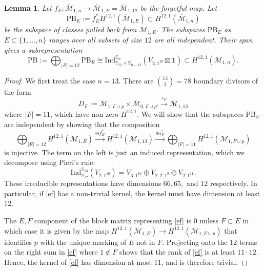 \documentclass[12pt]{amsart}
\newtheorem{lem}[thm]{Lemma}
\theoremstyle{definition}
\numberwithin{equation}{section}
\newcommand{\M}{\mathcal{M}}
\newcommand{\Mb}{\overline{\M}}
\newcommand{\pb}{\mathrm{PB}}
\theoremstyle{definition} %
\theoremstyle{remark}
\begin{document}
\begin{lem} \label{indep}
Let $f_E\colon \Mb_{1,n} \to \Mb_{1,E} = \Mb_{1,12}$ be the forgetful map. Let \[\pb_E := f_E^*H^{12,1}(\Mb_{1,E}) \subset H^{12,1}(\Mb_{1,n})\]
be the subspace of classes pulled back from $\Mb_{1,E}$. The subspaces $\pb_E$ as $E \subset \{1,\ldots, n\}$ ranges over all subsets of size $12$
are all independent. Their span gives a subrepresentation
\[\pb :=\bigoplus_{|E| = 12} \pb_E \cong \mathrm{Ind}^{\mathbb{S}_n}_{\mathbb{S}_{12} \times \mathbb{S}_{n-12}}(V_{2,1^{10}} \boxtimes \mathbf{1}) \subset H^{12,1}(\Mb_{1,n}).\]
\end{lem}
\begin{proof}
We first treat the case $n = 13$. 
There are $\binom{13}{2} = 78$ boundary divisors of the form 
\[D_F := \Mb_{1,F \cup p} \times \Mb_{0, F \cup p'} \xrightarrow{\iota_F} \Mb_{1,13}\] where $|F| = 11$, which have non-zero $H^{12,1}$.
We will show that the subspaces $\pb_E$ are independent by showing that the composition
\begin{equation} \label{ef} \bigoplus_{|E| = 12} H^{12,1}(\Mb_{1,E}) \xrightarrow{\oplus f_E^*} H^{12,1}(\Mb_{1,13}) \xrightarrow{\oplus \iota_F^*} \bigoplus_{|F| = 11} H^{12,1}(\Mb_{1,F \cup p})
\end{equation}
is injective. 
The term on the left is just an induced representation, which we decompose using Pieri's rule:
\[\mathrm{Ind}^{\mathbb{S}_{13}}_{\mathbb{S}_{12}} (V_{2, 1^{10}}) =  V_{3,1^{10}} \oplus V_{2,2,1^{9}} \oplus V_{2,1^{11}}.\]
These irreducible representations have dimensions $66, 65,$ and $12$ respectively. In particular, if \eqref{ef} has a non-trivial kernel, the kernel must have dimension at least $12$.

The $E, F$ component of the block matrix representing \eqref{ef} is $0$ unless $F \subset E$ in which case it is given by the map $H^{12,1}(\Mb_{1,E}) \to H^{12,1}(\Mb_{1,F \cup p})$ that identifies $p$ with the unique marking of $E$ not in $F$. Projecting onto the $12$ terms on the right sum in \eqref{ef} where $1 \notin F$ shows  that the rank of \eqref{ef} is at least $11 \cdot 12$. Hence, the kernel of \eqref{ef} has dimension at most $11$, and is therefore trivial.


\end{proof}
\end{document}

